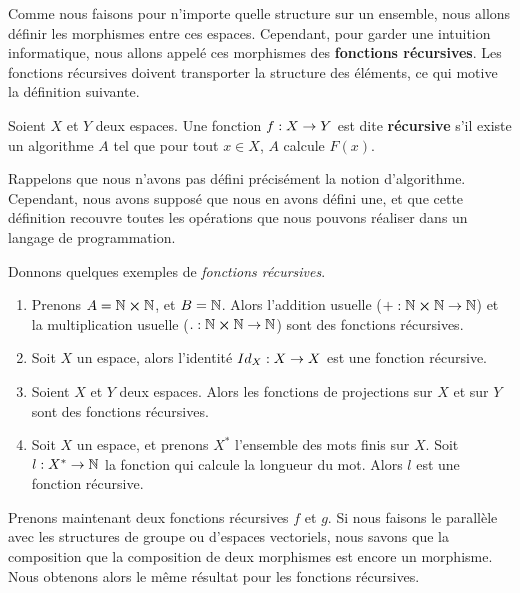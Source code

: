 Comme nous faisons pour n'importe quelle structure sur un ensemble, nous allons
définir les morphismes entre ces espaces. Cependant, pour garder une intuition
informatique, nous allons appelé ces morphismes des \textbf{fonctions
récursives}. Les fonctions récursives doivent transporter la structure des
éléments, ce qui motive la définition suivante.

\begin{definition}
	Soient $X$ et $Y$ deux espaces.
	Une fonction $f : X \rightarrow Y$ est dite \textbf{récursive} s'il existe
	un algorithme $A$ tel que pour tout $x \in X$, $A$ calcule $F(x)$.
\end{definition}

Rappelons que nous n'avons pas défini précisément la notion d'algorithme.
Cependant, nous avons supposé que nous en avons défini une, et que cette
définition recouvre toutes les opérations que nous pouvons réaliser dans un
langage de programmation.

Donnons quelques exemples de \textit{fonctions récursives}.

\begin{exemple}
	\begin{enumerate}
		\item Prenons $A = \mathbb{N} \cross \mathbb{N}$, et $B = \mathbb{N}$.
			Alors l'addition usuelle ($+ : \mathbb{N} \cross
			\mathbb{N} \rightarrow \mathbb{N}$) et la multiplication usuelle
			($. : \mathbb{N} \cross \mathbb{N} \rightarrow \mathbb{N}$) sont des
			fonctions récursives.
		\item Soit $X$ un espace, alors l'identité $Id_{X} : X \rightarrow X$
			est une fonction récursive.
		\item Soient $X$ et $Y$ deux espaces. Alors les fonctions de projections
			sur $X$ et sur $Y$ sont des fonctions récursives.
		\item Soit $X$ un espace, et prenons $X^{*}$ l'ensemble des mots finis
			sur $X$.
			Soit $l : X^{*} \rightarrow \mathbb{N}$ la fonction qui calcule la
			longueur du mot. Alors $l$ est une fonction récursive.
	\end{enumerate}
\end{exemple}

Prenons maintenant deux fonctions récursives $f$ et $g$. Si nous faisons le
parallèle avec les structures de groupe ou d'espaces vectoriels, nous savons que
la composition que la composition de deux morphismes est encore un morphisme.
Nous obtenons alors le même résultat pour les fonctions récursives.

